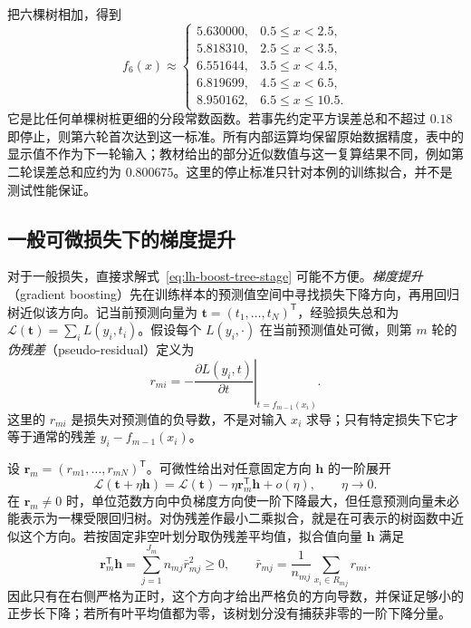 \begin{solve}
把六棵树相加，得到
\[
 f_6(x)\approx
 \begin{cases}
  5.630000,&0.5\leq x<2.5,\\
  5.818310,&2.5\leq x<3.5,\\
  6.551644,&3.5\leq x<4.5,\\
  6.819699,&4.5\leq x<6.5,\\
  8.950162,&6.5\leq x\leq10.5.
 \end{cases}
\]
它是比任何单棵树桩更细的分段常数函数。若事先约定平方误差总和不超过 $0.18$ 即停止，则第六轮首次达到这一标准。所有内部运算均保留原始数据精度，表中的显示值不作为下一轮输入；教材给出的部分近似数值与这一复算结果不同，例如第二轮误差总和应约为 $0.800675$。这里的停止标准只针对本例的训练拟合，并不是测试性能保证。
\end{solve}

\subsection{一般可微损失下的梯度提升}
\label{subsec:lh-boost-gradient}

对于一般损失，直接求解式~\eqref{eq:lh-boost-tree-stage} 可能不方便。\emph{梯度提升}（gradient boosting）先在训练样本的预测值空间中寻找损失下降方向，再用回归树近似该方向。记当前预测向量为 $\boldsymbol t=(t_1,\ldots,t_N)^{\mathsf T}$，经验损失总和为 $\mathcal L(\boldsymbol t)=\sum_iL(y_i,t_i)$。假设每个 $L(y_i,\cdot)$ 在当前预测值处可微，则第 $m$ 轮的\emph{伪残差}（pseudo-residual）定义为
\begin{equation}
 r_{mi}=-\left.\frac{\partial L(y_i,t)}{\partial t}\right|_{t=f_{m-1}(x_i)}.
 \label{eq:lh-boost-pseudo-residual}
\end{equation}
这里的 $r_{mi}$ 是损失对预测值的负导数，不是对输入 $x_i$ 求导；只有特定损失下它才等于通常的残差 $y_i-f_{m-1}(x_i)$。

设 $\boldsymbol r_m=(r_{m1},\ldots,r_{mN})^{\mathsf T}$。可微性给出对任意固定方向 $\boldsymbol h$ 的一阶展开
\[
 \mathcal L(\boldsymbol t+\eta\boldsymbol h)
 =\mathcal L(\boldsymbol t)-\eta\boldsymbol r_m^{\mathsf T}\boldsymbol h+o(\eta),
 \qquad \eta\to0.
\]
在 $\boldsymbol r_m\ne0$ 时，单位范数方向中负梯度方向使一阶下降最大，但任意预测向量未必能表示为一棵受限回归树。对伪残差作最小二乘拟合，就是在可表示的树函数中近似这个方向。若按固定非空叶划分取伪残差平均值，拟合值向量 $\boldsymbol h$ 满足
\[
 \boldsymbol r_m^{\mathsf T}\boldsymbol h
 =\sum_{j=1}^{J_m}n_{mj}\bar r_{mj}^2\geq0,
 \qquad
 \bar r_{mj}=\frac1{n_{mj}}\sum_{x_i\in R_{mj}}r_{mi}.
\]
因此只有在右侧严格为正时，这个方向才给出严格负的方向导数，并保证足够小的正步长下降；若所有叶平均值都为零，该树划分没有捕获非零的一阶下降分量。

